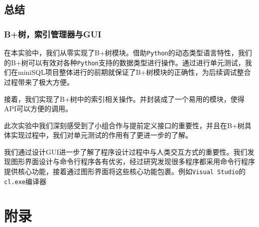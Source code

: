\documentclass[UTF8]{ctexrep} %
\begin{document}
\chapter{总结}
\section{B+树，索引管理器与GUI}
在本实验中，我们从零实现了B+树模块。借助\texttt{Python}的动态类型语言特性，我们的B+树可以有效对各种\texttt{Python}支持的数据类型进行操作。通过进行单元测试，我们在miniSQL项目整体进行的前期就保证了B+树模块的正确性，为后续调试整合过程带来了极大方便。
\par
接着，我们实现了B+树中的索引相关操作。并封装成了一个易用的模块，使得API可以方便的调用。
\par
此次实验中我们深刻感受到了小组合作与提前定义接口的重要性，并且在B+树具体实现过程中，我们对单元测试的作用有了更进一步的了解。
\par
我们通过设计GUI进一步了解了程序设计过程中与人类交互方式的重要性。我们发现图形界面设计与命令行程序各有优劣，经过研究发现很多程序都采用命令行程序提供核心功能，接着通过图形界面将这些核心功能包裹。例如\texttt{Visual Studio}的\texttt{cl.exe}编译器


\newpage
\part{附录}
\end{document}
